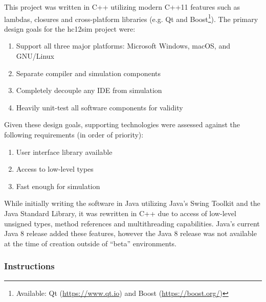 This project was written in C++ utilizing modern C++11 features such as lambdas, closures and cross-platform libraries (e.g. Qt and Boost\footnote{Available: Qt (\url{https://www.qt.io}) and Boost (\url{https://boost.org/})}). The primary design goals for the hc12sim project were:

\begin{enumerate}
    \item Support all three major platforms: Microsoft Windows, macOS, and GNU/Linux
    \item Separate compiler and simulation components
    \item Completely decouple any IDE from simulation
    \item Heavily unit-test all software components for validity
\end{enumerate}

Given these design goals, supporting technologies were assessed against the following requirements (in order of priority): 
\begin{enumerate}
    \item User interface library available
    \item Access to low-level types
    \item Fast enough for simulation
\end{enumerate}

While initially writing the software in Java utilizing Java's Swing Toolkit and the Java Standard Library, it was rewritten in C++ due to access of low-level unsigned types, method references and multithreading capabilities. Java's current Java 8 release added these features, however the Java 8 release was not available at the time of creation outside of ``beta'' environments.

\subsubsection*{Instructions}
\label{sec:hc12sim:instruction-generation}

